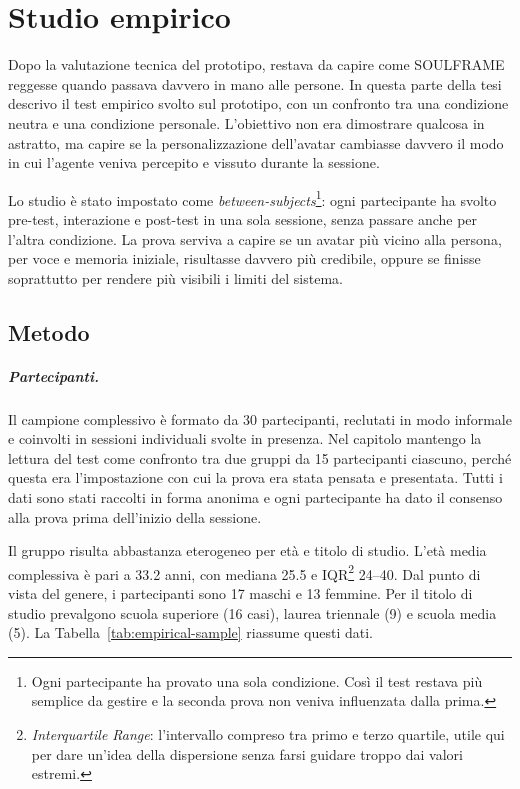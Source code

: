 \chapter{Studio empirico}
\label{chap:studio-empirico}

Dopo la valutazione tecnica del prototipo, restava da capire come SOULFRAME reggesse quando passava davvero in mano alle persone. In questa parte della tesi descrivo il test empirico svolto sul prototipo, con un confronto tra una condizione neutra e una condizione personale. L'obiettivo non era dimostrare qualcosa in astratto, ma capire se la personalizzazione dell'avatar cambiasse davvero il modo in cui l'agente veniva percepito e vissuto durante la sessione.

Lo studio è stato impostato come \textit{between-subjects}\footnote{Ogni partecipante ha provato una sola condizione. Così il test restava più semplice da gestire e la seconda prova non veniva influenzata dalla prima.}: ogni partecipante ha svolto pre-test, interazione e post-test in una sola sessione, senza passare anche per l'altra condizione. La prova serviva a capire se un avatar più vicino alla persona, per voce e memoria iniziale, risultasse davvero più credibile, oppure se finisse soprattutto per rendere più visibili i limiti del sistema.

\section{Metodo}
\label{sec:empirical-method}

\paragraph{Partecipanti.}
\label{subsec:empirical-participants}

Il campione complessivo è formato da 30 partecipanti, reclutati in modo informale e coinvolti in sessioni individuali svolte in presenza. Nel capitolo mantengo la lettura del test come confronto tra due gruppi da 15 partecipanti ciascuno, perché questa era l'impostazione con cui la prova era stata pensata e presentata. Tutti i dati sono stati raccolti in forma anonima e ogni partecipante ha dato il consenso alla prova prima dell'inizio della sessione.

Il gruppo risulta abbastanza eterogeneo per età e titolo di studio. L'età media complessiva è pari a 33.2 anni, con mediana 25.5 e IQR\footnote{\textit{Interquartile Range}: l'intervallo compreso tra primo e terzo quartile, utile qui per dare un'idea della dispersione senza farsi guidare troppo dai valori estremi.} 24--40. Dal punto di vista del genere, i partecipanti sono 17 maschi e 13 femmine. Per il titolo di studio prevalgono scuola superiore (16 casi), laurea triennale (9) e scuola media (5). La Tabella~\ref{tab:empirical-sample} riassume questi dati.

